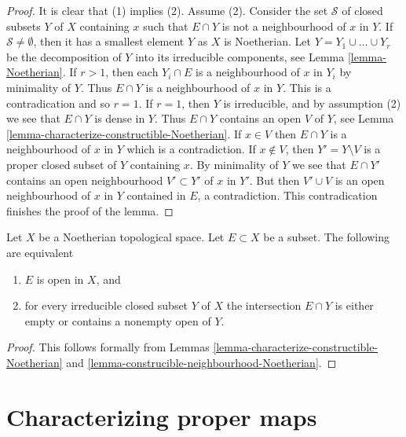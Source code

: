 \begin{proof}
It is clear that (1) implies (2). Assume (2).
Consider the set $\mathcal{S}$ of closed subsets $Y$ of $X$ containing $x$
such that $E \cap Y$ is not a neighbourhood of $x$ in $Y$.
If $\mathcal{S} \not = \emptyset$, then it has a smallest element $Y$
as $X$ is Noetherian.
Let $Y = Y_1 \cup \ldots \cup Y_r$ be the decomposition of $Y$ into its
irreducible components, see
Lemma \ref{lemma-Noetherian}.
If $r > 1$, then each $Y_i \cap E$ is a neighbourhood of $x$ in $Y_i$
by minimality of $Y$. Thus $E \cap Y$ is a neighbourhood of $x$ in $Y$.
This is a contradication and so $r = 1$. If $r = 1$, then $Y$ is
irreducible, and by assumption (2) we see that $E \cap Y$
is dense in $Y$. Thus $E \cap Y$ contains an open $V$ of $Y$, see
Lemma \ref{lemma-characterize-constructible-Noetherian}.
If $x \in V$ then $E \cap Y$ is a neighbourhood of $x$ in $Y$ which
is a contradiction. If $x \not \in V$, then $Y' = Y \setminus V$ is a
proper closed subset of $Y$ containing $x$. By minimality of $Y$
we see that $E \cap Y'$ contains an open neighbourhood $V' \subset Y'$
of $x$ in $Y'$. But then $V' \cup V$ is an open neighbourhood of $x$
in $Y$ contained in $E$, a contradiction.
This contradication finishes the proof of the lemma.
\end{proof}

\begin{lemma}
\label{lemma-characterize-open-Noetherian}
Let $X$ be a Noetherian topological space.
Let $E \subset X$ be a subset.
The following are equivalent
\begin{enumerate}
\item $E$ is open in $X$, and
\item for every irreducible closed subset $Y$ of $X$
the intersection $E \cap Y$ is either empty or
contains a nonempty open of $Y$.
\end{enumerate}
\end{lemma}

\begin{proof}
This follows formally from
Lemmas \ref{lemma-characterize-constructible-Noetherian} and
\ref{lemma-construcible-neighbourhood-Noetherian}.
\end{proof}









\section{Characterizing proper maps}
\label{section-proper}

